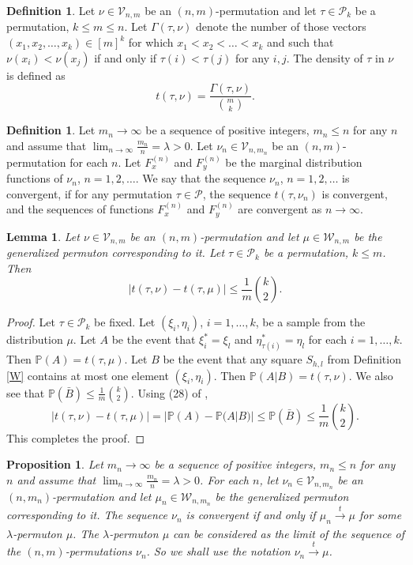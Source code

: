 \documentclass[12pt,twoside]{article}
\theoremstyle{definition}
\newtheorem{definition}[theorem]{Definition}
\theoremstyle{remark}
\numberwithin{equation}{section}
\theoremstyle{plain}
\newtheorem{prop}{Proposition}[section]
\newtheorem{lem}{Lemma}[section]
\theoremstyle{remark}
\def\P{{\mathbb {P}}}                       \def\Q{{\mathbb {Q}}}
\def\PD{{\mathcal P}}                     \def\PDW{{\tilde{\cal P}}}
\def\VD{{\mathcal V}}
\def\PD{{\mathcal P}}
\def\WD{{\mathcal W}}
\begin{document}
\begin{definition}  \label{deftPermDens}
Let $\nu\in \VD_{n,m}$ be an $(n,m)$-permutation and let $\tau\in \PD_k$ be a permutation, $k\le m \le n$.
Let $\Gamma(\tau, \nu)$ denote the number of those vectors 
$(x_1, x_2, \dots , x_k) \in [m]^k$ for which $x_1 < x_2 < \dots < x_k$ and such that
$\nu(x_i) < \nu(x_j)$ if and only if $\tau(i) < \tau(j)$ for any $i,j$.
The density of $\tau$ in $\nu$ is defined as
$$
t(\tau, \nu) = \frac{\Gamma(\tau, \nu) }{ \binom{m}{k} }.
$$
\end{definition}
%

\begin{definition}  \label{deftconvNU}
Let $m_n \to \infty$ be a sequence of positive integers, $m_n\le n$ for any $n$
and assume that $\lim_{n\to\infty} \frac{m_n}{n} = \lambda >0$.
Let $\nu_n\in \VD_{n,m_n}$ be an $(n,m)$-permutation for each $n$.
Let $F^{(n)}_x$ and $F^{(n)}_y$ be the marginal distribution functions of $\nu_n$, $n=1,2, \dots$.
We say that the sequence $\nu_n$, $n=1,2, \dots$ is convergent, if for any permutation $\tau\in \PD$, 
the sequence
$t(\tau, \nu_n)$ is convergent, 
and the sequences of functions $F^{(n)}_x$ and $F^{(n)}_y$ are convergent as $n\to \infty$.
\end{definition}
%

\begin{lem}  \label{H3.5}
Let $\nu\in \VD_{n,m}$ be an $(n,m)$-permutation and let $\mu\in \WD_{n,m}$ be the 
generalized permuton corresponding to it.
Let $\tau\in \PD_{k}$ be a permutation, $k\le m$.
Then
$$
|t(\tau, \nu) - t(\tau, \mu) | \le \frac{1}{m} \binom{k}{2} .
$$
\end{lem} 
%

\begin{proof}
Let $\tau\in \PD_{k}$ be fixed.
Let $(\xi_i, \eta_i)$, $i=1, \dots , k$, be a sample from the distribution $\mu$.
Let $A$ be the event that $\xi^{\ast}_i = \xi_l$ and 
$\eta^{\ast}_{\tau(i)} = \eta_l$ for each $i=1,\dots , k$.
 Then 
$\P(A) = t(\tau, \mu)$.
Let $B$ be the event that any square $S_{h,l}$ from Definition \ref{W}
 contains at most one element $(\xi_i, \eta_i)$.
Then $\P(A|B) = t(\tau, \nu)$.
We also see that 
$\P(\bar{B}) \le \frac{1}{m} \binom{k}{2}$.
Using (28) of \cite{Hoppen},
$$
|t(\tau, \nu) - t(\tau, \mu) | = | \P(A)- \P(A|B)| \le \P(\bar{B}) \le \frac{1}{m} \binom{k}{2} .
$$
This completes the proof.
\end{proof}
%

\begin{prop}  \label{F}
Let $m_n \to \infty$ be a sequence of positive integers, $m_n\le n$ for any $n$
and assume that $\lim_{n\to\infty} \frac{m_n}{n} = \lambda >0$.
For each $n$, let $\nu_n\in \VD_{n,m_n}$ be an $(n,m_n)$-permutation and let $\mu_n\in \WD_{n,m_n}$
be the generalized permuton corresponding to it.
The sequence
$\nu_n$ is convergent if and only if 
$\mu_n \xrightarrow[]{t} \mu$ for some $\lambda$-permuton $\mu$.
The $\lambda$-permuton $\mu$ can be considered as the limit of the sequence of the $(n,m)$-permutations  $\nu_n$.
So we shall use the notation $\nu_n \xrightarrow[]{t} \mu$.
\end{prop}
%
\end{document}
